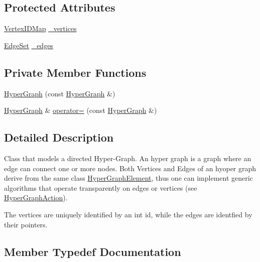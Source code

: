 \subsection*{Protected Attributes}
\begin{DoxyCompactItemize}
\item 
\mbox{\hyperlink{classg2o_1_1_hyper_graph_a97307eac064ebf4b3e2cfbf0718035b5}{Vertex\+I\+D\+Map}} \mbox{\hyperlink{classg2o_1_1_hyper_graph_a83132c77c8d0896581d168cbc72f673a}{\+\_\+vertices}}
\item 
\mbox{\hyperlink{classg2o_1_1_hyper_graph_a5e2970e236c0dcb4eff7c205d7b6b4ae}{Edge\+Set}} \mbox{\hyperlink{classg2o_1_1_hyper_graph_afe4ae6e9ef05c8bded2b1b30e1886b36}{\+\_\+edges}}
\end{DoxyCompactItemize}
\subsection*{Private Member Functions}
\begin{DoxyCompactItemize}
\item 
\mbox{\hyperlink{classg2o_1_1_hyper_graph_ab19a6e0681e2b30d48740cebf553c7eb}{Hyper\+Graph}} (const \mbox{\hyperlink{classg2o_1_1_hyper_graph}{Hyper\+Graph}} \&)
\item 
\mbox{\hyperlink{classg2o_1_1_hyper_graph}{Hyper\+Graph}} \& \mbox{\hyperlink{classg2o_1_1_hyper_graph_aace0adc6b03e56bf6b554368d49dcf88}{operator=}} (const \mbox{\hyperlink{classg2o_1_1_hyper_graph}{Hyper\+Graph}} \&)
\end{DoxyCompactItemize}


\subsection{Detailed Description}
Class that models a directed Hyper-\/\+Graph. An hyper graph is a graph where an edge can connect one or more nodes. Both Vertices and Edges of an hyoper graph derive from the same class \mbox{\hyperlink{structg2o_1_1_hyper_graph_1_1_hyper_graph_element}{Hyper\+Graph\+Element}}, thus one can implement generic algorithms that operate transparently on edges or vertices (see \mbox{\hyperlink{classg2o_1_1_hyper_graph_action}{Hyper\+Graph\+Action}}).

The vertices are uniquely identified by an int id, while the edges are identfied by their pointers. 

\subsection{Member Typedef Documentation}
\mbox{\label{classg2o_1_1_hyper_graph_a5e2970e236c0dcb4eff7c205d7b6b4ae}} 
